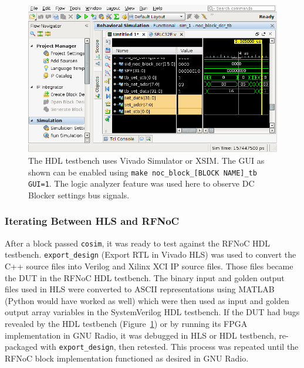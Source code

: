 \documentclass{article}
\begin{document}
\begin{figure}[h]
  \begin{center}
    \centerline{\includegraphics[width=\columnwidth]{xsim.png}}
    \caption{The HDL testbench uses Vivado Simulator or XSIM. The GUI as shown can be enabled using {\tt make noc\_block\_[BLOCK NAME]\_tb GUI=1}. The logic analyzer feature was used here to observe DC Blocker settings bus signals.}
    \label{xsim}
  \end{center}
\end{figure}

\subsubsection*{Iterating Between HLS and RFNoC}
After a block passed {\tt cosim}, it was ready to test against the RFNoC HDL testbench. {\tt export\_design} (Export RTL in Vivado HLS) was used to convert the C++ source files into Verilog and Xilinx XCI IP source files. Those files became the DUT in the RFNoC HDL testbench. The binary input and golden output files used in HLS were converted to ASCII representations using MATLAB (Python would have worked as well) which were then used as input and golden output array variables in the SystemVerilog HDL testbench. If the DUT had bugs revealed by the HDL testbench (Figure~\ref{xsim}) or by running its FPGA implementation in GNU Radio, it was debugged in HLS or HDL testbench, re-packaged with {\tt export\_design}, then retested. This process was repeated until the RFNoC block implementation functioned as desired in GNU Radio.
\end{document}

